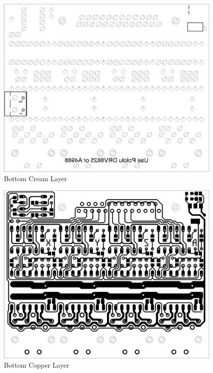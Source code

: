 \begin{figure}[h]
	\centering
	\includegraphics[width=1\textwidth]{pcb-design/bottomcream.png}
	\caption{Bottom Cream Layer}
	\label{fig:front}
\end{figure}
\begin{figure}[h]
	\centering
	\includegraphics[width=1\textwidth]{pcb-design/bottomroute.png}
	\caption{Bottom Copper Layer}
	\label{fig:front}
\end{figure}